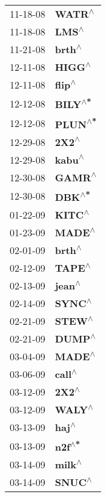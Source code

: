 \begin{supertabular}{p{0.08\textwidth}p{0.2\textwidth}}
 11-18-08 &    \textbf{WATR\textsuperscript{$\wedge$}} \\
 11-18-08 &     \textbf{LMS\textsuperscript{$\wedge$}} \\
 11-21-08 &    \textbf{brth\textsuperscript{$\wedge$}} \\
 12-11-08 &    \textbf{HIGG\textsuperscript{$\wedge$}} \\
 12-11-08 &    \textbf{flip\textsuperscript{$\wedge$}} \\
 12-12-08 &   \textbf{BILY\textsuperscript{$\wedge$*}} \\
 12-12-08 &   \textbf{PLUN\textsuperscript{$\wedge$*}} \\
 12-29-08 &     \textbf{2X2\textsuperscript{$\wedge$}} \\
 12-29-08 &    \textbf{kabu\textsuperscript{$\wedge$}} \\
 12-30-08 &    \textbf{GAMR\textsuperscript{$\wedge$}} \\
 12-30-08 &    \textbf{DBK\textsuperscript{$\wedge$*}} \\
 01-22-09 &    \textbf{KITC\textsuperscript{$\wedge$}} \\
 01-23-09 &    \textbf{MADE\textsuperscript{$\wedge$}} \\
 02-01-09 &    \textbf{brth\textsuperscript{$\wedge$}} \\
 02-12-09 &    \textbf{TAPE\textsuperscript{$\wedge$}} \\
 02-13-09 &    \textbf{jean\textsuperscript{$\wedge$}} \\
 02-14-09 &    \textbf{SYNC\textsuperscript{$\wedge$}} \\
 02-21-09 &    \textbf{STEW\textsuperscript{$\wedge$}} \\
 02-21-09 &    \textbf{DUMP\textsuperscript{$\wedge$}} \\
 03-04-09 &    \textbf{MADE\textsuperscript{$\wedge$}} \\
 03-06-09 &    \textbf{call\textsuperscript{$\wedge$}} \\
 03-12-09 &     \textbf{2X2\textsuperscript{$\wedge$}} \\
 03-12-09 &    \textbf{WALY\textsuperscript{$\wedge$}} \\
 03-13-09 &     \textbf{haj\textsuperscript{$\wedge$}} \\
 03-13-09 &    \textbf{n2f\textsuperscript{$\wedge$*}} \\
 03-14-09 &    \textbf{milk\textsuperscript{$\wedge$}} \\
 03-14-09 &    \textbf{SNUC\textsuperscript{$\wedge$}} \\

\end{supertabular}
